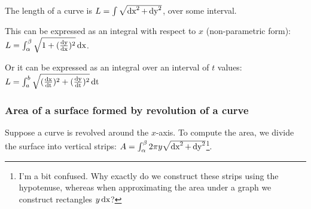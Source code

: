 \documentclass[12pt]{article}
\begin{document}
The length of a curve is $L = \int \sqrt{\operatorname{\text{dx}}^2 + \operatorname{\text{dy}}^2}$, over some interval.

This can be expressed as an integral with respect to $x$ (non-parametric form):
$L = \int_\alpha^\beta \sqrt{1 + (\frac{\operatorname{\text{dy}}}{\operatorname{\text{dx}}})^2} \operatorname{\text{dx}}$.

Or it can be expressed as an integral over an interval of $t$ values:
$L = \int_a^b \sqrt{ (\frac{\operatorname{\text{dx}}}{\operatorname{\text{dt}}})^2 + (\frac{\operatorname{\text{dy}}}{\operatorname{\text{dt}}})^2} \operatorname{\text{dt}}$

\subsubsection*{Area of a surface formed by revolution of a curve}

Suppose a curve is revolved around the $x$-axis. To compute the area, we divide the surface into vertical strips: $A = \int_\alpha^\beta 2\pi y \sqrt{\operatorname{\text{dx}}^2 + \operatorname{\text{dy}}^2}$\footnote{I'm a bit confused. Why exactly do we construct these strips using the hypotenuse, whereas when approximating the area under a graph we construct rectangles $y\operatorname{\text{dx}}$?}.
\end{document}
